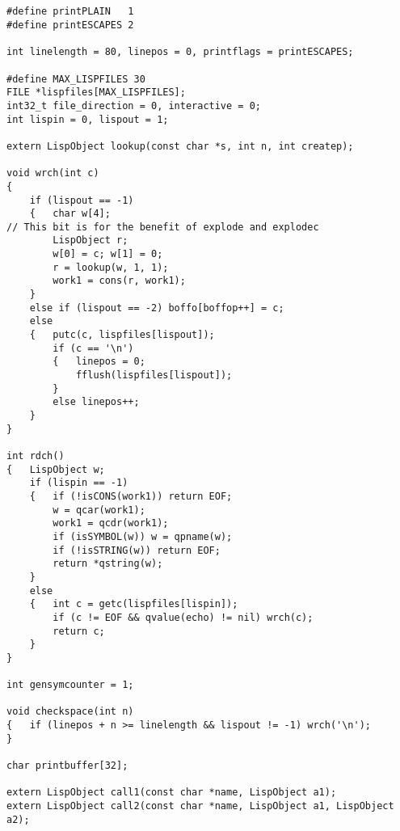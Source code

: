 

{\begin{verbatim}


#define printPLAIN   1
#define printESCAPES 2

int linelength = 80, linepos = 0, printflags = printESCAPES;

#define MAX_LISPFILES 30
FILE *lispfiles[MAX_LISPFILES];
int32_t file_direction = 0, interactive = 0;
int lispin = 0, lispout = 1;

extern LispObject lookup(const char *s, int n, int createp);

void wrch(int c)
{
    if (lispout == -1)
    {   char w[4];
// This bit is for the benefit of explode and explodec
        LispObject r;
        w[0] = c; w[1] = 0;
        r = lookup(w, 1, 1);
        work1 = cons(r, work1);
    }
    else if (lispout == -2) boffo[boffop++] = c;
    else
    {   putc(c, lispfiles[lispout]);
        if (c == '\n')
        {   linepos = 0;
            fflush(lispfiles[lispout]);
        }
        else linepos++;
    }
}

int rdch()
{   LispObject w;
    if (lispin == -1)
    {   if (!isCONS(work1)) return EOF;
        w = qcar(work1);
        work1 = qcdr(work1);
        if (isSYMBOL(w)) w = qpname(w);
        if (!isSTRING(w)) return EOF;
        return *qstring(w);
    }
    else
    {   int c = getc(lispfiles[lispin]);
        if (c != EOF && qvalue(echo) != nil) wrch(c);
        return c;
    }
}

int gensymcounter = 1;

void checkspace(int n)
{   if (linepos + n >= linelength && lispout != -1) wrch('\n');
}

char printbuffer[32];

extern LispObject call1(const char *name, LispObject a1);
extern LispObject call2(const char *name, LispObject a1, LispObject a2);


\end{verbatim}}
